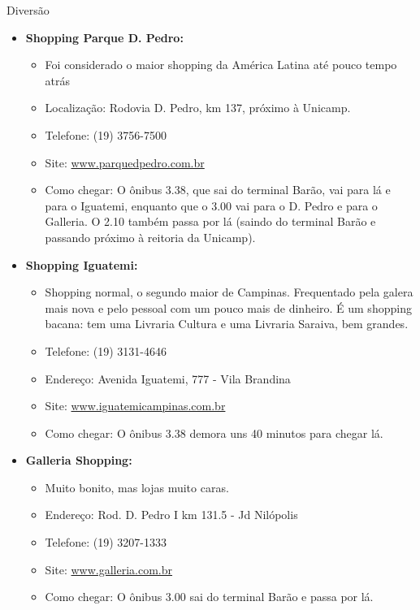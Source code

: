 \begin{story}{Diversão}
\begin{itemize}

\item \textbf{Shopping Parque D. Pedro:}
\begin{itemize}
\item Foi considerado o maior shopping da América Latina até pouco tempo atrás
\item Localização: Rodovia D. Pedro, km 137, próximo à Unicamp.
\item Telefone: (19) 3756-7500
\item Site: \url{www.parquedpedro.com.br}
\item Como chegar: O ônibus 3.38, que sai do terminal Barão, vai para lá e para o Iguatemi, enquanto que o 3.00 vai para o D. Pedro e para o Galleria. O 2.10 também passa por lá (saindo do terminal Barão e passando próximo à reitoria da Unicamp).
\end{itemize}

\item \textbf{Shopping Iguatemi:}
\begin{itemize}
\item Shopping normal, o segundo maior de Campinas. Frequentado pela galera mais nova e pelo pessoal com um pouco mais de dinheiro. É um shopping bacana: tem uma Livraria Cultura e uma Livraria Saraiva, bem grandes.
\item Telefone: (19) 3131-4646
\item Endereço: Avenida Iguatemi, 777 - Vila Brandina
\item Site: \url{www.iguatemicampinas.com.br}
\item Como chegar: O ônibus 3.38 demora uns 40 minutos para chegar lá.
\end{itemize}

\item \textbf{Galleria Shopping:}
\begin{itemize}
\item Muito bonito, mas lojas muito caras.
\item Endereço: Rod. D. Pedro I km 131.5 - Jd Nilópolis
\item Telefone: (19) 3207-1333
\item Site: \url{www.galleria.com.br}
\item Como chegar: O ônibus 3.00 sai do terminal Barão e passa por lá.
\end{itemize}


\end{itemize}
\end{story}
